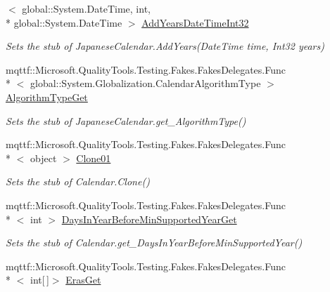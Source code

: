 \begin{DoxyCompactItemize}
$<$ global\-::\-System.\-Date\-Time, int, \\*
global\-::\-System.\-Date\-Time $>$ \hyperlink{class_system_1_1_globalization_1_1_fakes_1_1_stub_japanese_calendar_a6a95608a4f4d70f6a83a4ac3a7e526de}{Add\-Years\-Date\-Time\-Int32}
\begin{DoxyCompactList}\small\item\em Sets the stub of Japanese\-Calendar.\-Add\-Years(\-Date\-Time time, Int32 years)\end{DoxyCompactList}\item 
mqttf\-::\-Microsoft.\-Quality\-Tools.\-Testing.\-Fakes.\-Fakes\-Delegates.\-Func\\*
$<$ global\-::\-System.\-Globalization.\-Calendar\-Algorithm\-Type $>$ \hyperlink{class_system_1_1_globalization_1_1_fakes_1_1_stub_japanese_calendar_ae442b2d968b43faa59d1f5e8960ae173}{Algorithm\-Type\-Get}
\begin{DoxyCompactList}\small\item\em Sets the stub of Japanese\-Calendar.\-get\-\_\-\-Algorithm\-Type()\end{DoxyCompactList}\item 
mqttf\-::\-Microsoft.\-Quality\-Tools.\-Testing.\-Fakes.\-Fakes\-Delegates.\-Func\\*
$<$ object $>$ \hyperlink{class_system_1_1_globalization_1_1_fakes_1_1_stub_japanese_calendar_a8457b5a872a0869b69f5ead66c5d40af}{Clone01}
\begin{DoxyCompactList}\small\item\em Sets the stub of Calendar.\-Clone()\end{DoxyCompactList}\item 
mqttf\-::\-Microsoft.\-Quality\-Tools.\-Testing.\-Fakes.\-Fakes\-Delegates.\-Func\\*
$<$ int $>$ \hyperlink{class_system_1_1_globalization_1_1_fakes_1_1_stub_japanese_calendar_aa405a3af6535959e08886c874ba6503f}{Days\-In\-Year\-Before\-Min\-Supported\-Year\-Get}
\begin{DoxyCompactList}\small\item\em Sets the stub of Calendar.\-get\-\_\-\-Days\-In\-Year\-Before\-Min\-Supported\-Year()\end{DoxyCompactList}\item 
mqttf\-::\-Microsoft.\-Quality\-Tools.\-Testing.\-Fakes.\-Fakes\-Delegates.\-Func\\*
$<$ int\mbox{[}$\,$\mbox{]}$>$ \hyperlink{class_system_1_1_globalization_1_1_fakes_1_1_stub_japanese_calendar_a73411b69cdd5342b3545633e26aafddf}{Eras\-Get}

\end{DoxyCompactItemize}

